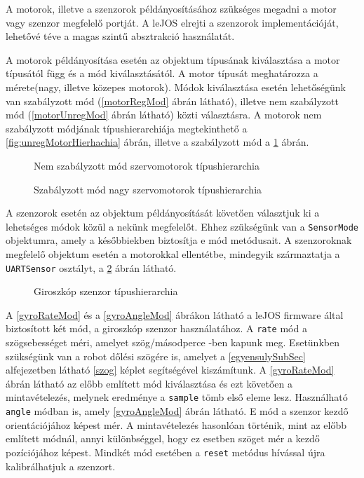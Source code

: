 A motorok, illetve a szenzorok példányosításához szükséges megadni a motor vagy szenzor megfelelő portját. A leJOS elrejti a szenzorok implementációját, lehetővé téve a magas szintű absztrakció használatát.

A motorok példányosítása esetén az objektum típusának kiválasztása a motor típusától függ és a mód kiválasztásától. A motor típusát meghatározza a mérete(nagy, illetve közepes motorok). Módok kiválasztása esetén lehetőségünk van szabályzott mód (\ref{motorRegMod} ábrán látható), illetve nem szabályzott mód  (\ref{motorUnregMod} ábrán látható) közti választásra. A motorok nem szabályzott módjának típushierarchiája megtekinthető a \ref{fig:unregMotorHierhachia} ábrán, illetve a szabályzott mód a \ref{fig:regMotorHierhachia} ábrán.

\begin{figure}[!htb]
	\centering
	\captionsetup{justification=centering,margin=1.5cm}
	\caption{Nem szabályzott mód szervomotorok típushierarchia}
	\label{fig:unregMotorHierhachia}
	\endminipage
	\captionsetup{margin=1.5cm}
	\caption{Szabályzott mód nagy szervomotorok típushierarchia}
	\label{fig:regMotorHierhachia}
	\endminipage
\end{figure}
 
 A szenzorok esetén az objektum példányosítását követően választjuk ki a lehetséges módok közül a nekünk megfelelőt. Ehhez szükségünk van a \texttt{SensorMode} objektumra, amely a későbbiekben biztosítja e mód metódusait. A szenzoroknak megfelelő objektum esetén a motorokkal ellentétbe, mindegyik származtatja a \texttt{UARTSensor} osztályt, a \ref{fig:gyroHierhachia} ábrán látható.

\begin{figure}[!htb]
	\centering
	\caption{Giroszkóp szenzor típushierarchia}
	\label{fig:gyroHierhachia}
\end{figure}


A \ref{gyroRateMod} és a \ref{gyroAngleMod} ábrákon látható a leJOS firmware által biztosított két mód, a giroszkóp szenzor használatához. A \texttt{rate} mód a szögsebességet méri, amelyet szög/másodperce -ben kapunk meg. Esetünkben szükségünk van a robot dőlési szögére is, amelyet a \ref{egyensulySubSec} alfejezetben látható \ref{szog} képlet segítségével  kiszámítunk. A \ref{gyroRateMod} ábrán látható az előbb említett mód kiválasztása és ezt követően a mintavételezés, melynek eredménye a \texttt{sample} tömb első eleme lesz. Használható \texttt{angle} módban is, amely \ref{gyroAngleMod} ábrán látható. E mód a szenzor kezdő orientációjához képest mér. A mintavételezés hasonlóan történik, mint az előbb említett módnál, annyi különbséggel, hogy ez esetben szöget mér a kezdő pozíciójához képest. Mindkét mód esetében a \texttt{reset} metódus hívással újra kalibrálhatjuk a szenzort.

